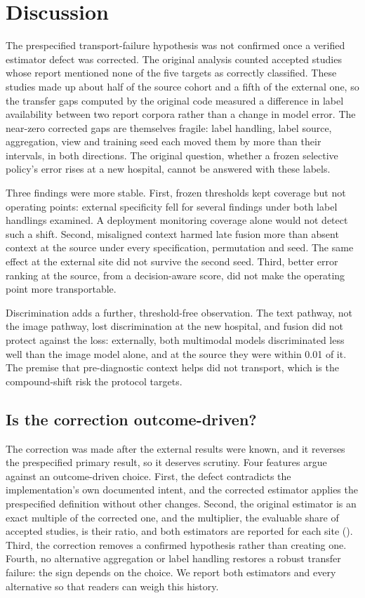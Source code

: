 \section*{Discussion}

The prespecified transport-failure hypothesis was not confirmed once a
verified estimator defect was corrected. The original analysis counted accepted
studies whose report mentioned none of the five targets as correctly
classified. These studies made up about half of the source cohort and a fifth
of the external one, so the transfer gaps computed by the original code measured a difference in
label availability between two report corpora rather than a change in model
error. The near-zero corrected gaps are themselves fragile: label handling,
label source, aggregation, view and training seed each moved them by more than
their intervals, in both directions. The original question, whether a frozen
selective policy's error rises at a new hospital, cannot be answered with these
labels.

Three findings were more stable. First, frozen thresholds kept coverage but not
operating points: external specificity fell for several findings under both
label handlings examined. A deployment monitoring coverage alone would not
detect such a shift. Second, misaligned context harmed late fusion more than
absent context at the source under every specification, permutation and seed.
The same effect at the external site did not survive the second seed. Third,
better error ranking at the source, from a decision-aware score, did not make
the operating point more transportable.

Discrimination adds a further, threshold-free observation. The text pathway,
not the image pathway, lost discrimination at the new hospital, and fusion did
not protect against the loss: externally, both multimodal models discriminated
less well than the image model alone, and at the source they were within 0.01
of it. The premise that pre-diagnostic context helps did not transport, which
is the compound-shift risk the protocol targets.

\subsection*{Is the correction outcome-driven?}
The correction was made after the external results were known, and it reverses
the prespecified primary result, so it deserves scrutiny. Four features argue
against an outcome-driven choice. First, the defect contradicts the
implementation's own documented intent, and the corrected estimator applies the
prespecified definition without other changes. Second, the original estimator is
an exact multiple of the corrected one, and the multiplier, the evaluable share
of accepted studies, is their ratio, and both estimators are reported for each
site (). Third, the correction removes
a confirmed hypothesis rather than creating one. Fourth, no alternative
aggregation or label handling restores a robust transfer failure: the sign
depends on the choice. We report both estimators and every alternative so that
readers can weigh this history.

